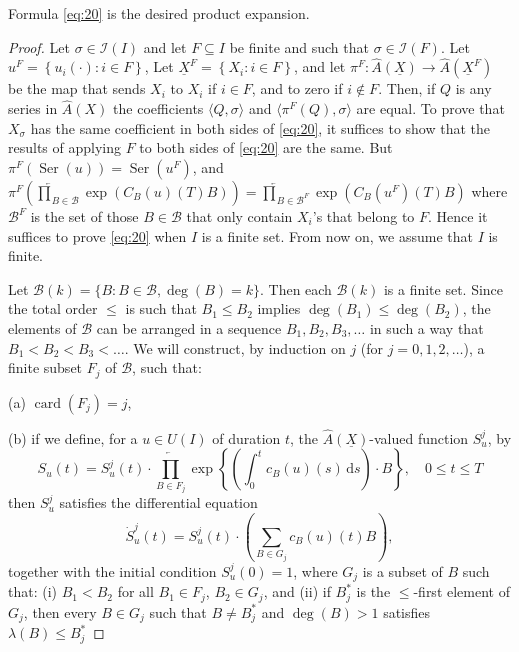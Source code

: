 \documentclass[leqno]{article}
\theoremstyle{plain}
\newcommand{\dd}{\,\mathrm{d}}
\newcommand{\Ser}{\operatorname{Ser}}
\begin{document}
Formula \eqref{eq:20} is the desired product expansion.

\begin{proof}
	Let $\sigma \in \mathcal{I}(I)$ and let $F \subseteq I$ be finite and such that $\sigma \in \mathcal{I}(F)$. Let $u^{F}=\left\{u_{i}(\cdot): i \in F\right\}$, Let $\underline{X}^{F}=\left\{X_{i}: i \in F\right\}$, and let $\pi^{F}: \hat{A}(\underline{X}) \rightarrow \hat{A}\left(\underline{X}^{F}\right)$ be the map that sends $X_{i}$ to $X_i$ if $i \in F$, and to zero if $i \notin F$.
	Then, if $Q$ is any series in $\hat{A}(X)$ the coefficients $\langle Q, \sigma \rangle$ and $\langle \pi^F (Q),\sigma \rangle$ are equal.
	To prove that $X_\sigma$ has the same coefficient in both sides of \eqref{eq:20}, it suffices to show that the results of applying $F$ to both sides of \eqref{eq:20} are the same.
	But $\pi^{F}(\Ser(u))=\Ser\left(u^{F}\right)$, and $\pi^{F}\left(\overleftarrow{\prod}_{B \in \mathcal{B}} \exp \left(C_{B}(u)(T) B\right)\right) = \overleftarrow{\prod}_{B \in \mathcal{B}^{F}} \exp \left(C_{B}\left(u^{F}\right)(T) {B}\right)$ where $\mathcal{B}^F$ is the set of those $B \in \mathcal{B}$ that only contain $X_i$'s that belong to $F$.	
	Hence it suffices to prove \eqref{eq:20} when $I$ is a finite set.  From now on, we assume that $I$ is finite.

	Let $\mathcal{B}(k)=\{B: B \in \mathcal{B}, \operatorname{deg}(B)=k\}$. 
	Then each $\mathcal{B}(k)$ is a finite set. 
	Since the total order $\leq$ is such that $B_{1} \leq B_{2}$ implies $\operatorname{deg}\left(B_1\right) \leq \operatorname{deg}\left(B_{2}\right)$, the elements of $\mathcal{B}$ can be arranged in a sequence $B_1, B_2, B_3, \ldots$ in such a way that $B_{1}<B_{2}<B_{3}<\ldots$. 
	We will construct, by induction on $j$ (for $j=0,1,2, \ldots$), a finite subset $F_{j}$ of $\mathcal{B}$, such that:
	
	(a) $\operatorname{card}\left(F_{j}\right)=j$,

	(b) if we define, for a $u \in U(I)$ of duration $t$, the $\hat{A}(\underline{X})$-valued function $S_{u}^{j}$, by
	\begin{equation} \label{eq:21}
		S_{u}(t)=S_{u}^{j}(t) \cdot \overleftarrow{\prod_{B \in F_j}} \exp \left\{\left(\int_{0}^{t} c_{B}(u)(s) \dd s\right) \cdot B\right\}, \quad 0 \leq t \leq T
	\end{equation}
	then $S_{u}^{j}$ satisfies the differential equation
	\begin{equation}
		\dot{S}_{u}^{j}(t)=S_{u}^{j}(t) \cdot\left(\sum_{B \in G_{j}} c_{B}(u)(t) B\right),
	\end{equation}
	together with the initial condition $S_{u}^{j}(0)=1$, where $G_{j}$ is a subset of $B$ such that: (i) $B_{1} < B_{2}$ for all $B_{1} \in F_{j}$, $B_{2} \in G_{j}$, and (ii) if $B_{j}^{*}$ is the $\leq$-first element of $G_{j}$, then every $B \in G_{j}$ such that $B \neq B_{j}^{*}$ and $\operatorname{deg}(B)>1$ satisfies $\lambda(B) \leq B_{j}^{*}$


\end{proof}
\end{document}
